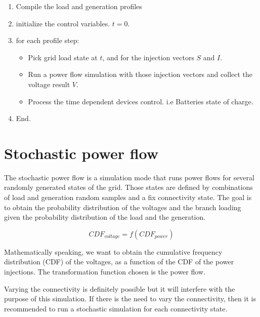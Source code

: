 \documentclass[nols,a4paper,twoside,notoc,fleqn]{tufte-book}
\begin{document}
\begin{enumerate}
	\item Compile the load and generation profiles
	
	\item initialize the control variables. $t=0$.
	
	\item for each profile step:
	
	\begin{itemize}
		\item Pick grid load state at $t$, and for the injection vectors $S$ and $I$.
		
		\item Run a power flow simulation with those injection vectors and collect the voltage result $V$.
		
		\item Process the time dependent devices control. i.e Batteries state of charge.
		
	\end{itemize}

	\item End.
\end{enumerate}


\chapter{Stochastic power flow}

The stochastic power flow is a simulation mode that runs power flows for several randomly generated states of the grid. Those states are defined by combinations of load and generation random samples and a fix connectivity state. The goal is to obtain the probability distribution of the voltages and the branch loading given the probability distribution of the load and the generation. 

$$
CDF_{voltage} = f(CDF_{power})
$$

Mathematically speaking, we want to obtain the cumulative frequency distribution (CDF) of the voltages, as a function of the CDF of the power injections. The transformation function chosen is the power flow.

Varying the connectivity is definitely possible but it will interfere with the purpose of this simulation. If there is the need to vary the connectivity, then it is recommended to run a stochastic simulation for each connectivity state.
\end{document}
